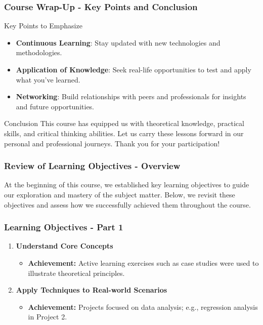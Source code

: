 \documentclass[aspectratio=169]{beamer}
\begin{document}
\begin{frame}[fragile]
    \frametitle{Course Wrap-Up - Key Points and Conclusion}
    \begin{block}{Key Points to Emphasize}
        \begin{itemize}
            \item \textbf{Continuous Learning}: Stay updated with new technologies and methodologies.
            \item \textbf{Application of Knowledge}: Seek real-life opportunities to test and apply what you've learned.
            \item \textbf{Networking}: Build relationships with peers and professionals for insights and future opportunities.
        \end{itemize}
    \end{block}

    \begin{block}{Conclusion}
        This course has equipped us with theoretical knowledge, practical skills, and critical thinking abilities. Let us carry these lessons forward in our personal and professional journeys. Thank you for your participation!
    \end{block}
\end{frame}

\begin{frame}[fragile]
    \frametitle{Review of Learning Objectives - Overview}
    At the beginning of this course, we established key learning objectives to guide our exploration and mastery of the subject matter. 
    Below, we revisit these objectives and assess how we successfully achieved them throughout the course.
\end{frame}

\begin{frame}[fragile]
    \frametitle{Learning Objectives - Part 1}
    \begin{enumerate}
        \item \textbf{Understand Core Concepts}
        \begin{itemize}
            \item \textbf{Achievement:} Active learning exercises such as case studies were used to illustrate theoretical principles.
        \end{itemize}
        
        \item \textbf{Apply Techniques to Real-world Scenarios}
        \begin{itemize}
            \item \textbf{Achievement:} Projects focused on data analysis; e.g., regression analysis in Project 2.
        \end{itemize}
    \end{enumerate}
\end{frame}
\end{document}
